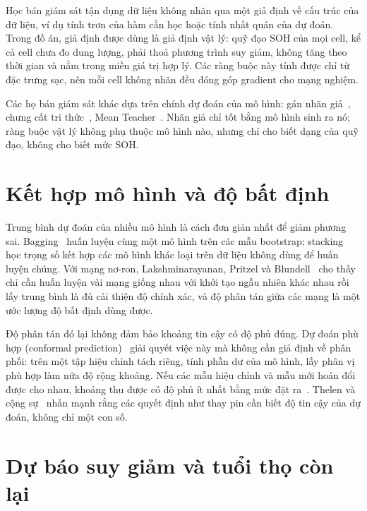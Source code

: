 \documentclass[12pt,a4paper,oneside]{report}
\theoremstyle{plain}
\theoremstyle{definition}
\begin{document}
Học bán giám sát tận dụng dữ liệu không nhãn qua một giả định về cấu trúc của dữ liệu, ví dụ tính trơn của
hàm cần học hoặc tính nhất quán của dự đoán. Trong đồ án, giả định được dùng là giả định vật lý: quỹ đạo SOH
của mọi cell, kể cả cell chưa đo dung lượng, phải thoả phương trình suy giảm, không tăng theo thời gian và nằm
trong miền giá trị hợp lý. Các ràng buộc này tính được chỉ từ đặc trưng sạc, nên mỗi cell không nhãn đều
đóng góp gradient cho mạng nghiệm.

Các họ bán giám sát khác dựa trên chính dự đoán của mô hình: gán nhãn giả~\cite{lee2013}, chưng cất tri
thức~\cite{hinton2015}, Mean Teacher~\cite{tarvainen2017}. Nhãn giả chỉ tốt bằng mô hình sinh ra nó; ràng buộc vật lý
không phụ thuộc mô hình nào, nhưng chỉ cho biết dạng của quỹ đạo, không cho biết mức SOH.

\section{Kết hợp mô hình và độ bất định}

Trung bình dự đoán của nhiều mô hình là cách đơn giản nhất để giảm phương sai. Bagging~\cite{breiman1996} huấn
luyện cùng một mô hình trên các mẫu bootstrap; stacking~\cite{wolpert1992} học trọng số kết hợp các mô hình khác
loại trên dữ liệu không dùng để huấn luyện chúng. Với mạng nơ-ron, Lakshminarayanan, Pritzel và
Blundell~\cite{lakshminarayanan2017} cho thấy chỉ cần huấn luyện vài mạng giống nhau với khởi tạo ngẫu nhiên khác
nhau rồi lấy trung bình là đủ cải thiện độ chính xác, và độ phân tán giữa các mạng là một ước lượng độ bất định
dùng được.

Độ phân tán đó lại không đảm bảo khoảng tin cậy có độ phủ đúng. Dự đoán phù hợp (conformal
prediction)~\cite{vovk2005,lei2018} giải quyết việc này mà không cần giả định về phân phối: trên một tập hiệu
chỉnh tách riêng, tính phần dư của mô hình, lấy phân vị phù hợp làm nửa độ rộng khoảng. Nếu các mẫu hiệu chỉnh
và mẫu mới hoán đổi được cho nhau, khoảng thu được có độ phủ ít nhất bằng mức đặt ra~\cite{angelopoulos2023}.
Thelen và cộng sự~\cite{thelen2024} nhấn mạnh rằng các quyết định như thay pin cần biết độ tin cậy của dự đoán,
không chỉ một con số.

\section{Dự báo suy giảm và tuổi thọ còn lại}\label{sec:rul_theory}
\end{document}
